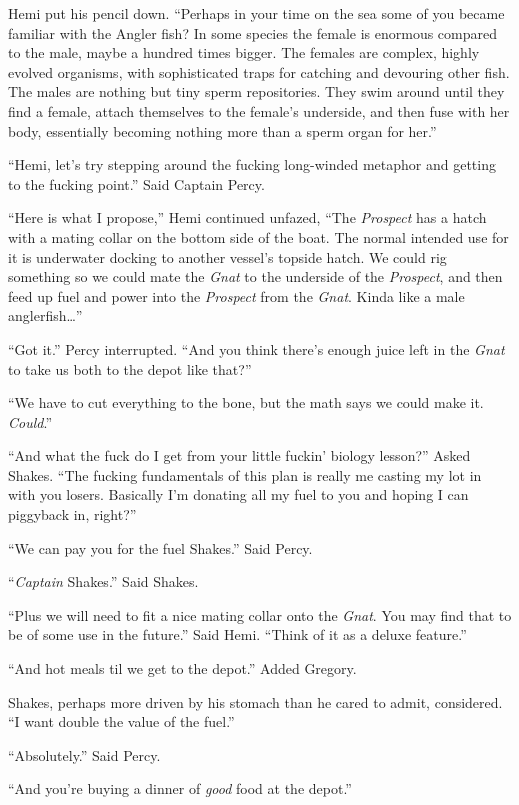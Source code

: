 \documentclass[
]{scrbook}
\begin{document}
Hemi put his pencil down. ``Perhaps in your time on the sea some of you
became familiar with the Angler fish? In some species the female is
enormous compared to the male, maybe a hundred times bigger. The females
are complex, highly evolved organisms, with sophisticated traps for
catching and devouring other fish. The males are nothing but tiny sperm
repositories. They swim around until they find a female, attach
themselves to the female's underside, and then fuse with her body,
essentially becoming nothing more than a sperm organ for her.''

``Hemi, let's try stepping around the fucking long-winded metaphor and
getting to the fucking point.'' Said Captain Percy.

``Here is what I propose,'' Hemi continued unfazed, ``The
\emph{Prospect} has a hatch with a mating collar on the bottom side of
the boat. The normal intended use for it is underwater docking to
another vessel's topside hatch. We could rig something so we could mate
the \emph{Gnat} to the underside of the \emph{Prospect}, and then feed
up fuel and power into the \emph{Prospect} from the \emph{Gnat}. Kinda
like a male anglerfish\ldots{}''

``Got it.'' Percy interrupted. ``And you think there's enough juice left
in the \emph{Gnat} to take us both to the depot like that?''

``We have to cut everything to the bone, but the math says we could make
it. \emph{Could}.''

``And what the fuck do I get from your little fuckin' biology lesson?''
Asked Shakes. ``The fucking fundamentals of this plan is really me
casting my lot in with you losers. Basically I'm donating all my fuel to
you and hoping I can piggyback in, right?''

``We can pay you for the fuel Shakes.'' Said Percy.

``\emph{Captain} Shakes.'' Said Shakes.

``Plus we will need to fit a nice mating collar onto the \emph{Gnat}.
You may find that to be of some use in the future.'' Said Hemi. ``Think
of it as a deluxe feature.''

``And hot meals til we get to the depot.'' Added Gregory.

Shakes, perhaps more driven by his stomach than he cared to admit,
considered. ``I want double the value of the fuel.''

``Absolutely.'' Said Percy.

``And you're buying a dinner of \emph{good} food at the depot.''
\end{document}
